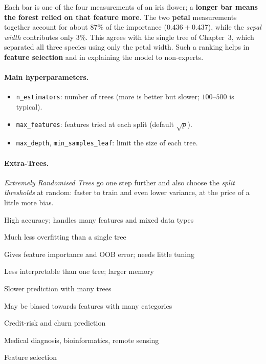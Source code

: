 \begin{explain}
Each bar is one of the four measurements of an iris flower; a \textbf{longer bar means the forest relied on that feature more}. The two \textbf{petal} measurements together account for about $87\%$ of the importance ($0.436+0.437$), while the \emph{sepal width} contributes only $3\%$. This agrees with the single tree of Chapter~3, which separated all three species using only the petal width. Such a ranking helps in \textbf{feature selection} and in explaining the model to non-experts.
\end{explain}


\paragraph{Main hyperparameters.}
\begin{itemize}
  \item \texttt{n\_estimators}: number of trees (more is better but slower; $100$--$500$ is typical).
  \item \texttt{max\_features}: features tried at each split (default $\sqrt p$).
  \item \texttt{max\_depth}, \texttt{min\_samples\_leaf}: limit the size of each tree.
\end{itemize}

\paragraph{Extra-Trees.} \emph{Extremely Randomised Trees} go one step further and also choose the \emph{split thresholds} at random: faster to train and even lower variance, at the price of a little more bias.

{\item High accuracy; handles many features and mixed data types
 \item Much less overfitting than a single tree
 \item Gives feature importance and OOB error; needs little tuning}
{\item Less interpretable than one tree; larger memory
 \item Slower prediction with many trees
 \item May be biased towards features with many categories}
{\item Credit-risk and churn prediction
 \item Medical diagnosis, bioinformatics, remote sensing
 \item Feature selection}

